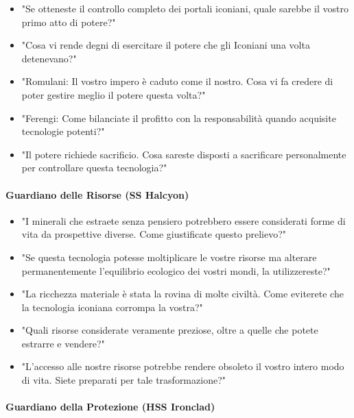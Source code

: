 \documentclass[letterpaper,twocolumn,openany,nodeprecatedcode]{dndbook}
\begin{document}
\begin{itemize}
    \item "Se otteneste il controllo completo dei portali iconiani, quale sarebbe il vostro primo atto di potere?"
    \item "Cosa vi rende degni di esercitare il potere che gli Iconiani una volta detenevano?"
    \item "Romulani: Il vostro impero è caduto come il nostro. Cosa vi fa credere di poter gestire meglio il potere questa volta?"
    \item "Ferengi: Come bilanciate il profitto con la responsabilità quando acquisite tecnologie potenti?"
    \item "Il potere richiede sacrificio. Cosa sareste disposti a sacrificare personalmente per controllare questa tecnologia?"
\end{itemize}

\paragraph{Guardiano delle Risorse (SS Halcyon)}

\begin{itemize}
    \item "I minerali che estraete senza pensiero potrebbero essere considerati forme di vita da prospettive diverse. Come giustificate questo prelievo?"
    \item "Se questa tecnologia potesse moltiplicare le vostre risorse ma alterare permanentemente l'equilibrio ecologico dei vostri mondi, la utilizzereste?"
    \item "La ricchezza materiale è stata la rovina di molte civiltà. Come eviterete che la tecnologia iconiana corrompa la vostra?"
    \item "Quali risorse considerate veramente preziose, oltre a quelle che potete estrarre e vendere?"
    \item "L'accesso alle nostre risorse potrebbe rendere obsoleto il vostro intero modo di vita. Siete preparati per tale trasformazione?"
\end{itemize}

\paragraph{Guardiano della Protezione (HSS Ironclad)}
\end{document}
